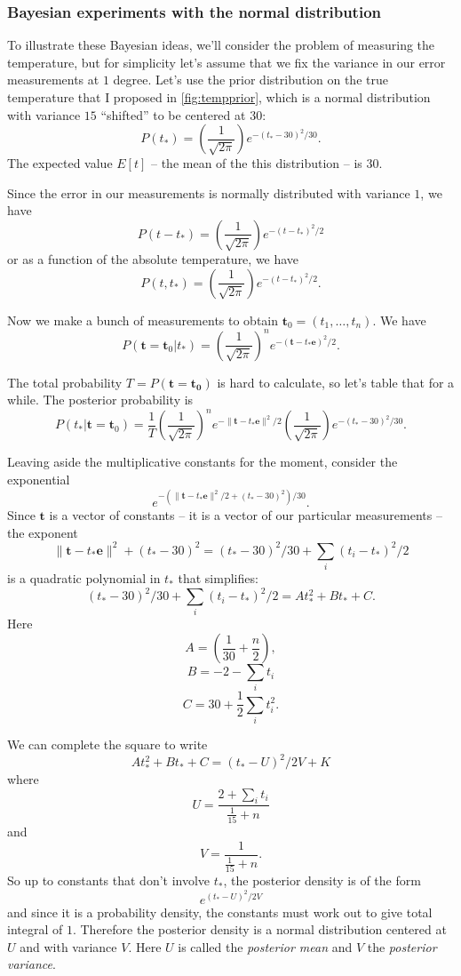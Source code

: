 \documentclass[
]{article}
\begin{document}
\hypertarget{bayesian-experiments-with-the-normal-distribution}{%
\subsubsection{Bayesian experiments with the normal
distribution}\label{bayesian-experiments-with-the-normal-distribution}}

To illustrate these Bayesian ideas, we'll consider the problem of
measuring the temperature, but for simplicity let's assume that we fix
the variance in our error measurements at \(1\) degree. Let's use the
prior distribution on the true temperature that I proposed in
\cref{fig:tempprior}, which is a normal distribution with variance
\(15\) ``shifted'' to be centered at \(30\): \[
P(t_*)=\left(\frac{1}{\sqrt{2\pi}}\right)e^{-(t_*-30)^2/30}.
\] The expected value \(E[t]\) -- the mean of the this distribution --
is \(30\).

Since the error in our measurements is normally distributed with
variance \(1\), we have \[
P(t-t_{*})=\left(\frac{1}{\sqrt{2\pi}}\right)e^{-(t-t_{*})^2/2}
\] or as a function of the absolute temperature, we have \[
P(t,t_{*}) = \left(\frac{1}{\sqrt{2\pi}}\right)e^{-(t-t_*)^2/2}.
\]

Now we make a bunch of measurements to obtain
\(\mathbf{t}_0=(t_1,\ldots, t_n)\). We have \[
P(\mathbf{t}=\mathbf{t}_0|t_{*}) = \left(\frac{1}{\sqrt{2\pi}}\right)^ne^{-(\mathbf{t}-t_*\mathbf{e})^2/2}.
\]

The total probability \(T=P(\mathbf{t}=\mathbf{t_0})\) is hard to
calculate, so let's table that for a while. The posterior probability is
\[
P(t_{*}|\mathbf{t}=\mathbf{t}_{0}) = \frac{1}{T} 
\left(\frac{1}{\sqrt{2\pi}}\right)^ne^{-\|\mathbf{t}-t_*\mathbf{e}\|^2/2}
\left(\frac{1}{\sqrt{2\pi}}\right)e^{-(t_*-30)^2/30}.
\]

Leaving aside the multiplicative constants for the moment, consider the
exponential \[
e^{-(\|\mathbf{t}-t_{*}\mathbf{e}\|^2/2+(t_{*}-30)^2)/30}.
\] Since \(\mathbf{t}\) is a vector of constants -- it is a vector of
our particular measurements -- the exponent \[
\|\mathbf{t}-t_{*}\mathbf{e}\|^2+(t_{*}-30)^2 = (t_{*}-30)^2/30+\sum_{i} (t_{i}-t_{*})^2/2
\] is a quadratic polynomial in \(t_{*}\) that simplifies: \[
(t_{*}-30)^2/30+\sum_{i} (t_{i}-t_{*})^2/2 = At_{*}^2+Bt_{*}+C.
\] Here \[
A=(\frac{1}{30}+\frac{n}{2}),
\] \[
B=-2-\sum_{i} t_{i}
\] \[
C=30+\frac{1}{2}\sum_{i} t_{i}^2.
\]

We can complete the square to write \[
At_{*}^2+Bt_{*}+C = (t_{*}-U)^2/2V +K
\] where \[
U=\frac{2+\sum_{i}t_{i}}{\frac{1}{15}+n}
\] and \[ 
V=\frac{1}{\frac{1}{15}+n}.
\] So up to constants that don't involve \(t_{*}\), the posterior
density is of the form \[
e^{(t_{*}-U)^2/2V}
\] and since it is a probability density, the constants must work out to
give total integral of \(1\). Therefore the posterior density is a
normal distribution centered at \(U\) and with variance \(V\). Here
\(U\) is called the \emph{posterior mean} and \(V\) the \emph{posterior
variance}.
\end{document}
